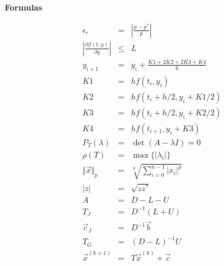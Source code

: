 \documentclass[12pt]{article}
\begin{document}
\begin{enumerate}[leftmargin=*,widest=9]
  \end{enumerate}
  
  \textbf{Formulas}
  
%  
  \begin{eqnarray*}
  \epsilon_r & = & \left\vert \frac{p - p^*}{p} \right\vert \\
  \left\vert \frac{\partial f(t, y)}{\partial y} \right\vert & \leq & L \\
  y_{i+1} & = & y_i + \frac{K1 + 2K2 + 2K3 + K4}{6} \\
  K1 & = & hf(t_i, y_i) \\
  K2 & = & hf(t_i + h/2, y_i + K1/2) \\
  K3 & = & hf(t_i + h/2, y_i + K2/2) \\
  K4 & = & hf(t_{i+1}, y_i + K3)\\
%  
%  
  P_{T}(\lambda) & = & \det(A-\lambda I) = 0 \\
  \rho(T) & = & \max \lbrace \vert \lambda_i \vert \rbrace \\
  \Vert \vec{x} \Vert_{p} & = & \sqrt[p]{\sum_{i=0}^{n-1} \vert x_i \vert^p} \\
  \left\vert z \right\vert & = & \sqrt{zz^*} \\
  A & = & D - L - U \\
  T_J & = & D^{-1}(L+U) \\
  \vec{c}_J & = & D^{-1}\vec{b} \\
  T_G & = & (D-L)^{-1}U \\
  \vec{x}^{(k+1)} & = & T\vec{x}^{(k)} + \vec{c}
  \end{eqnarray*}
  
  
  
\end{document}
